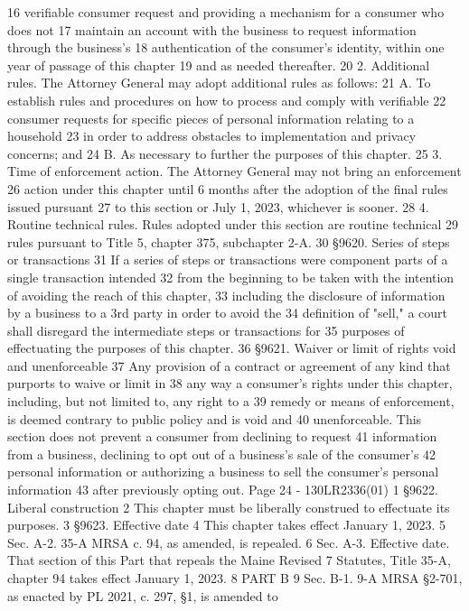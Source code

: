 16 verifiable consumer request and providing a mechanism for a consumer who does not
17 maintain an account with the business to request information through the business's
18 authentication of the consumer's identity, within one year of passage of this chapter
19 and as needed thereafter.
20 2. Additional rules. The Attorney General may adopt additional rules as follows:
21 A. To establish rules and procedures on how to process and comply with verifiable
22 consumer requests for specific pieces of personal information relating to a household
23 in order to address obstacles to implementation and privacy concerns; and
24 B. As necessary to further the purposes of this chapter.
25 3. Time of enforcement action. The Attorney General may not bring an enforcement
26 action under this chapter until 6 months after the adoption of the final rules issued pursuant
27 to this section or July 1, 2023, whichever is sooner.
28 4. Routine technical rules. Rules adopted under this section are routine technical
29 rules pursuant to Title 5, chapter 375, subchapter 2-A.
30 §9620. Series of steps or transactions
31 If a series of steps or transactions were component parts of a single transaction intended
32 from the beginning to be taken with the intention of avoiding the reach of this chapter,
33 including the disclosure of information by a business to a 3rd party in order to avoid the
34 definition of "sell," a court shall disregard the intermediate steps or transactions for
35 purposes of effectuating the purposes of this chapter.
36 §9621. Waiver or limit of rights void and unenforceable
37 Any provision of a contract or agreement of any kind that purports to waive or limit in
38 any way a consumer's rights under this chapter, including, but not limited to, any right to a
39 remedy or means of enforcement, is deemed contrary to public policy and is void and
40 unenforceable. This section does not prevent a consumer from declining to request
41 information from a business, declining to opt out of a business's sale of the consumer's
42 personal information or authorizing a business to sell the consumer's personal information
43 after previously opting out.
Page 24 - 130LR2336(01)
1 §9622. Liberal construction
2 This chapter must be liberally construed to effectuate its purposes.
3 §9623. Effective date
4 This chapter takes effect January 1, 2023.
5 Sec. A-2. 35-A MRSA c. 94, as amended, is repealed.
6 Sec. A-3. Effective date. That section of this Part that repeals the Maine Revised
7 Statutes, Title 35-A, chapter 94 takes effect January 1, 2023.
8 PART B
9 Sec. B-1. 9-A MRSA §2-701, as enacted by PL 2021, c. 297, §1, is amended to

